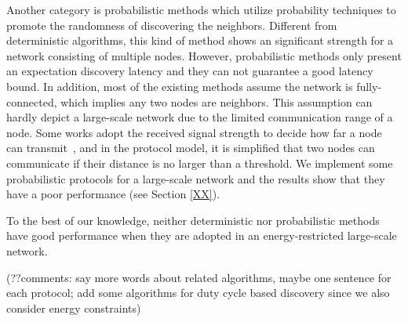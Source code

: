 Another category is probabilistic methods \cite{mcglynn2001birthday,
vasudevan2009neighbor,you2011aloha,song2014probabilistic} which utilize probability techniques to promote the randomness
of discovering the neighbors. 
Different from deterministic algorithms,
this kind of method shows an significant strength for a network consisting of multiple nodes.
However, probabilistic methods only present an expectation discovery latency and they
can not guarantee a good latency bound.
In addition, most of the existing methods assume the network is fully-connected, which implies any two nodes are neighbors. 
This assumption can hardly depict a large-scale network due to the limited communication range of a node.
Some works adopt the received signal strength to decide how far a node can transmit~\cite{daiya2011experimental}, and in the protocol model, it is simplified that two nodes can communicate if their distance is no larger than a threshold.
We implement some probabilistic protocols for a large-scale network and the results show that they have a poor performance (see Section \ref{XX}).


To the best of our knowledge, neither deterministic nor probabilistic methods have good performance when they are adopted in an energy-restricted large-scale network.


(??comments: say more words about related algorithms, maybe one sentence for each protocol; add some algorithms for duty cycle based discovery since we also consider energy constraints)



